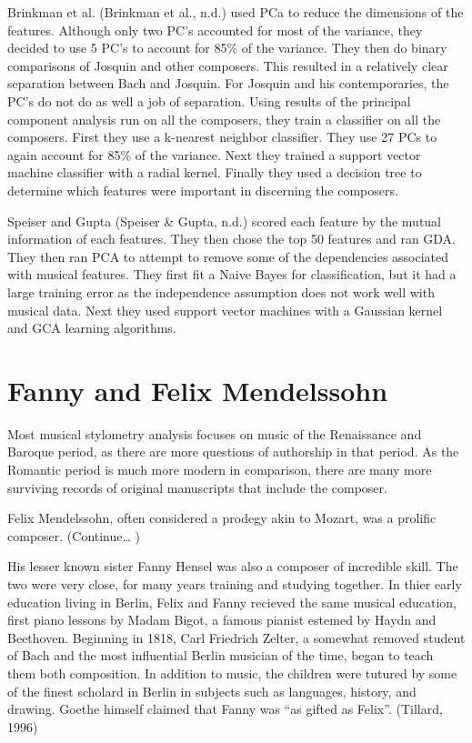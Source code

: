 \documentclass[12pt,twoside]{reedthesis}
\theoremstyle{definition}
\theoremstyle{definition}
\theoremstyle{definition}
\theoremstyle{remark}
\begin{document}
Brinkman et al. (Brinkman et al., n.d.) used PCa to reduce the
dimensions of the features. Although only two PC's accounted for most of
the variance, they decided to use 5 PC's to account for 85\% of the
variance. They then do binary comparisons of Josquin and other
composers. This resulted in a relatively clear separation between Bach
and Josquin. For Josquin and his contemporaries, the PC's do not do as
well a job of separation. Using results of the principal component
analysis run on all the composers, they train a classifier on all the
composers. First they use a k-nearest neighbor classifier. They use 27
PCs to again account for 85\% of the variance. Next they trained a
support vector machine classifier with a radial kernel. Finally they
used a decision tree to determine which features were important in
discerning the composers.

Speiser and Gupta (Speiser \& Gupta, n.d.) scored each feature by the
mutual information of each features. They then chose the top 50 features
and ran GDA. They then ran PCA to attempt to remove some of the
dependencies associated with musical features. They first fit a Naive
Bayes for classification, but it had a large training error as the
independence assumption does not work well with musical data. Next they
used support vector machines with a Gaussian kernel and GCA learning
algorithms.

\section{Fanny and Felix Mendelssohn}\label{fanny-and-felix-mendelssohn}

Most musical stylometry analysis focuses on music of the Renaissance and
Baroque period, as there are more questions of authorship in that
period. As the Romantic period is much more modern in comparison, there
are many more surviving records of original manuscripts that include the
composer.

Felix Mendelssohn, often considered a prodegy akin to Mozart, was a
prolific composer. (Continue\ldots{} )

His lesser known sister Fanny Hensel was also a composer of incredible
skill. The two were very close, for many years training and studying
together. In thier early education living in Berlin, Felix and Fanny
recieved the same musical education, first piano lessons by Madam Bigot,
a famous pianist estemed by Haydn and Beethoven. Beginning in 1818, Carl
Friedrich Zelter, a somewhat removed student of Bach and the most
influential Berlin musician of the time, began to teach them both
composition. In addition to music, the children were tutured by some of
the finest scholard in Berlin in subjects such as languages, history,
and drawing. Goethe himself claimed that Fanny was ``as gifted as
Felix''. (Tillard, 1996)
\end{document}
